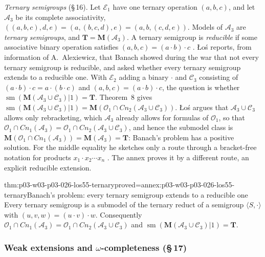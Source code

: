 \emph{Ternary semigroups} (\S\,16).  Let \(\mathcal E_1\) have one ternary
operation \((a,b,c)\), and let \(\mathcal A_3\) be its complete associativity,
\(((a,b,c),d,e)=(a,(b,c,d),e)=(a,b,(c,d,e))\).  Models of \(\mathcal A_3\) are
\emph{ternary semigroups}, and \(\mathbf T=\mathbf M(\mathcal A_3)\).  A
ternary semigroup is \emph{reducible} if some associative binary operation
satisfies \((a,b,c)=(a\cdot b)\cdot c\) \cite[pp.~52--53]{Los1955}.  \L o\'s
reports, from information of A.~Alexiewicz, that Banach showed during the war
that not every ternary semigroup is reducible, and asked whether every
ternary semigroup extends to a reducible one.  With \(\mathcal E_2\) adding a
binary \(\cdot\) and \(\mathcal C_3\) consisting of
\((a\cdot b)\cdot c=a\cdot(b\cdot c)\) and \((a,b,c)=(a\cdot b)\cdot c\), the
question is whether
\(\operatorname{sm}(\mathbf M(\mathcal A_3\cup\mathcal C_3)|1)=\mathbf T\).
Theorem~8 gives
\(\operatorname{sm}(\mathbf M(\mathcal A_3\cup\mathcal C_3)|1)=\mathbf M(\mathcal O_1\cap\mathit{Cn}_2(\mathcal A_3\cup\mathcal C_3))\).
\L o\'s argues that \(\mathcal A_3\cup\mathcal C_3\) allows only rebracketing,
which \(\mathcal A_3\) already allows for formulas of \(\mathcal O_1\), so that
\(\mathcal O_1\cap\mathit{Cn}_1(\mathcal A_3)=\mathcal O_1\cap\mathit{Cn}_2(\mathcal A_3\cup\mathcal C_3)\),
and hence the submodel class is
\(\mathbf M(\mathcal O_1\cap\mathit{Cn}_1(\mathcal A_3))=\mathbf M(\mathcal A_3)=\mathbf T\):
Banach's problem has a positive solution.  For the middle equality he
sketches only a route through a bracket-free notation for products
\(x_1\cdot x_2\cdots x_n\) \cite[p.~53]{Los1955}.  The annex proves it by a
different route, an explicit reducible extension.

\begin{hbtheorem}{thm:p03-w03-p03-026-los55-ternary}{proved=annex:p03-w03-p03-026-los55-ternary}{Banach's problem: every ternary semigroup extends to a reducible one}
Every ternary semigroup is a submodel of the ternary reduct of a semigroup
\(\langle S,\cdot\rangle\) with \((u,v,w)=(u\cdot v)\cdot w\).  Consequently
\(\mathcal O_1\cap\mathit{Cn}_1(\mathcal A_3)=\mathcal O_1\cap\mathit{Cn}_2(\mathcal A_3\cup\mathcal C_3)\)
and \(\operatorname{sm}(\mathbf M(\mathcal A_3\cup\mathcal C_3)|1)=\mathbf T\).
\end{hbtheorem}

\subsubsection{Weak extensions and \(\omega\)-completeness (\S\,17)}

